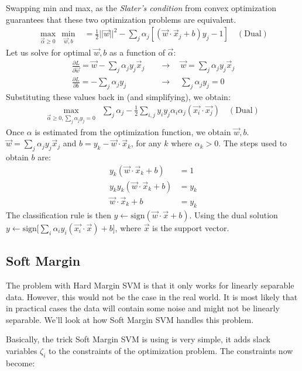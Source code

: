 \documentclass{article}
\begin{document}
Swapping min and max, as the \emph{Slater's condition} from convex optimization guarantees that these two optimization problems are equivalent.
\begin{align*}
\max_{\vec{\alpha}\geq0} \, \min_{\vec{w},b} &= \frac{1}{2}||\vec{w}||^2 - \sum_j \alpha_j [(\vec{w} \cdot \vec{x}_j + b)y_j - 1] \quad \mathrm{(Dual)}
\end{align*}
Let us solve for optimal $\vec{w}, b$ as a function of $\vec{\alpha}$: 
\begin{align*}
\frac{\partial L}{\partial \vec{w}} = \vec{w} - \sum_j \alpha_j y_j \vec{x}_j \quad & \rightarrow \quad \vec{w} = \sum_j \alpha_j y_j \vec{x}_j \\
\frac{\partial L}{\partial b} = - \sum_j \alpha_j y_j \quad & \rightarrow \quad \sum_j \alpha_j y_j = 0
\end{align*}
Substituting these values back in (and simplifying), we obtain: 
\begin{align*}
\max_{\vec{\alpha}\geq0, \sum_j \alpha_j y_j = 0} & \sum_j \alpha_j - \frac{1}{2} \sum_{i,j} y_iy_j\alpha_i\alpha_j (\vec{x_i}\cdot \vec{x_j}) \quad \mathrm{(Dual)} 
\end{align*}
Once $\alpha$ is estimated from the optimization function, we obtain $\vec{w}, b$.
$\vec{w} = \sum_j \alpha_j y_j \vec{x}_j$ and $b = y_k - \vec{w}\cdot \vec{x}_k$, for any $k$ where $\alpha_k > 0$.
The steps used to obtain $b$ are:
\begin{align*}
y_k (\vec{w}\cdot \vec{x}_k + b) &= 1 \\
y_ky_k (\vec{w}\cdot \vec{x}_k + b) &= y_k \\
\vec{w}\cdot \vec{x}_k + b &= y_k
\end{align*}
The classification rule is then $y \leftarrow \mathrm{sign} (\vec{w}\cdot\vec{x}+b)$. Using the dual solution $y \leftarrow \mathrm{sign} \big[\sum_i\alpha_iy_i(\vec{x_i}\cdot \vec{x})+b\big]$, where $\vec{x}$ is the support vector.

\subsection{Soft Margin}
The problem with Hard Margin SVM is that it only works for linearly separable data. However, this would not be the case in the real world. It is most likely that in practical cases the data will contain some noise and might not be linearly separable. We'll look at how Soft Margin SVM handles this problem.

Basically, the trick Soft Margin SVM is using is very simple, it adds slack variables $\zeta_i$ to the constraints of the optimization problem. The constraints now become:
\end{document}
